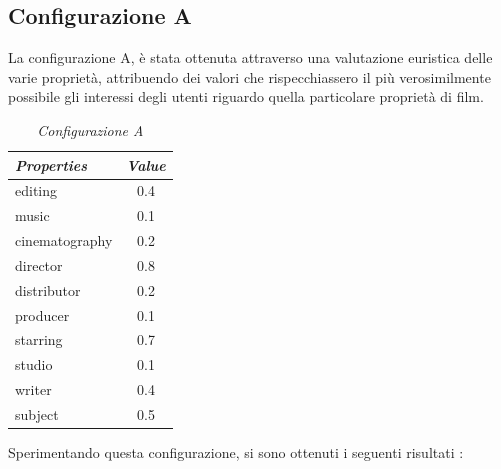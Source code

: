 \subsection{Configurazione A}
La configurazione A, è stata ottenuta attraverso una valutazione euristica delle varie proprietà, attribuendo dei valori che rispecchiassero il più verosimilmente possibile gli interessi degli utenti riguardo quella particolare proprietà di film.
\begin{table}[H]
\small
\centering
\begin{tabular}{l c}
\textit{Properties} & \textit{Value} \\\hline
editing & 0.4 \\
music & 0.1 \\
cinematography & 0.2 \\
director & 0.8 \\
distributor & 0.2 \\
producer & 0.1 \\
starring & 0.7 \\
studio & 0.1 \\
writer & 0.4 \\
subject & 0.5 \\
\end{tabular}
\caption{\emph{Configurazione A}}
\end{table}
Sperimentando questa configurazione, si sono ottenuti i seguenti risultati : 
\setlength{\tabcolsep}{12pt}

